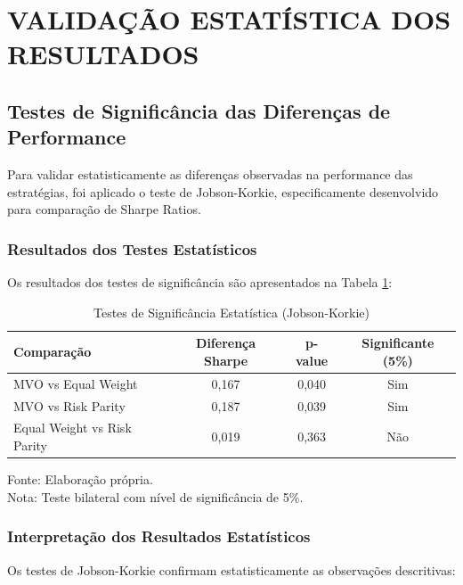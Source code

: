 \section{VALIDAÇÃO ESTATÍSTICA DOS RESULTADOS}

\subsection{Testes de Significância das Diferenças de Performance}

Para validar estatisticamente as diferenças observadas na performance das estratégias, foi aplicado o teste de Jobson-Korkie, especificamente desenvolvido para comparação de Sharpe Ratios.

\subsubsection{Resultados dos Testes Estatísticos}

Os resultados dos testes de significância são apresentados na Tabela \ref{tab:testes_significancia}:

\begin{table}[htbp]
\centering
\caption{Testes de Significância Estatística (Jobson-Korkie)}
\label{tab:testes_significancia}
\begin{tabular}{|l|c|c|c|}
\hline
\textbf{Comparação} & \textbf{Diferença Sharpe} & \textbf{p-value} & \textbf{Significante (5\%)} \\
\hline
MVO vs Equal Weight & 0,167 & 0,040 & Sim \\
MVO vs Risk Parity & 0,187 & 0,039 & Sim \\
Equal Weight vs Risk Parity & 0,019 & 0,363 & Não \\
\hline
\end{tabular}
\footnotesize
Fonte: Elaboração própria.\\
Nota: Teste bilateral com nível de significância de 5\%.
\end{table}

\subsubsection{Interpretação dos Resultados Estatísticos}

Os testes de Jobson-Korkie confirmam estatisticamente as observações descritivas:


